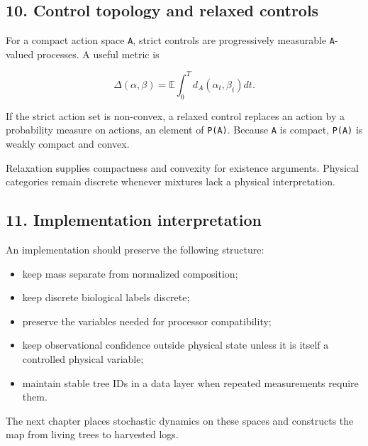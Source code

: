 \subsection{10. Control topology and relaxed controls}\label{control-topology-and-relaxed-controls}

For a compact action space \texttt{A}, strict controls are progressively measurable
\texttt{A}-valued processes. A useful metric is

\[
\Delta(\alpha,\beta)=\mathbb E\int_0^T d_A(\alpha_t,\beta_t)dt.
\]

If the strict action set is non-convex, a relaxed control replaces an action by
a probability measure on actions, an element of \texttt{P(A)}. Because \texttt{A} is compact,
\texttt{P(A)} is weakly compact and convex.

Relaxation supplies compactness and convexity for existence arguments. Physical
categories remain discrete whenever mixtures lack a physical interpretation.

\subsection{11. Implementation interpretation}\label{implementation-interpretation}

An implementation should preserve the following structure:

\begin{itemize}
\tightlist
\item
  keep mass separate from normalized composition;
\item
  keep discrete biological labels discrete;
\item
  preserve the variables needed for processor compatibility;
\item
  keep observational confidence outside physical state unless it is itself a
  controlled physical variable;
\item
  maintain stable tree IDs in a data layer when repeated measurements require
  them.
\end{itemize}

The next chapter places stochastic dynamics on these spaces and constructs the
map from living trees to harvested logs.
